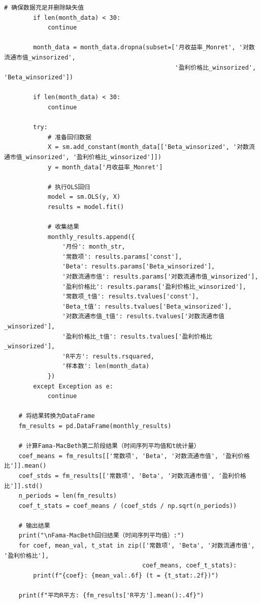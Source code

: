 \documentclass[12pt, a4paper]{article}
\begin{document}
\begin{lstlisting}[basicstyle=\small\ttfamily, breaklines=true, columns=fullflexible]
        # 确保数据充足并删除缺失值
        if len(month_data) < 30:
            continue
        
        month_data = month_data.dropna(subset=['月收益率_Monret', '对数流通市值_winsorized', 
                                               '盈利价格比_winsorized', 'Beta_winsorized'])
        
        if len(month_data) < 30:
            continue
        
        try:
            # 准备回归数据
            X = sm.add_constant(month_data[['Beta_winsorized', '对数流通市值_winsorized', '盈利价格比_winsorized']])
            y = month_data['月收益率_Monret']
            
            # 执行OLS回归
            model = sm.OLS(y, X)
            results = model.fit()
            
            # 收集结果
            monthly_results.append({
                '月份': month_str,
                '常数项': results.params['const'],
                'Beta': results.params['Beta_winsorized'],
                '对数流通市值': results.params['对数流通市值_winsorized'],
                '盈利价格比': results.params['盈利价格比_winsorized'],
                '常数项_t值': results.tvalues['const'],
                'Beta_t值': results.tvalues['Beta_winsorized'],
                '对数流通市值_t值': results.tvalues['对数流通市值_winsorized'],
                '盈利价格比_t值': results.tvalues['盈利价格比_winsorized'],
                'R平方': results.rsquared,
                '样本数': len(month_data)
            })
        except Exception as e:
            continue
    
    # 将结果转换为DataFrame
    fm_results = pd.DataFrame(monthly_results)
    
    # 计算Fama-MacBeth第二阶段结果（时间序列平均值和t统计量）
    coef_means = fm_results[['常数项', 'Beta', '对数流通市值', '盈利价格比']].mean()
    coef_stds = fm_results[['常数项', 'Beta', '对数流通市值', '盈利价格比']].std()
    n_periods = len(fm_results)
    coef_t_stats = coef_means / (coef_stds / np.sqrt(n_periods))
    
    # 输出结果
    print("\nFama-MacBeth回归结果（时间序列平均值）:")
    for coef, mean_val, t_stat in zip(['常数项', 'Beta', '对数流通市值', '盈利价格比'], 
                                      coef_means, coef_t_stats):
        print(f"{coef}: {mean_val:.6f} (t = {t_stat:.2f})")
    
    print(f"平均R平方: {fm_results['R平方'].mean():.4f}")
    

\end{lstlisting}
\end{document}
